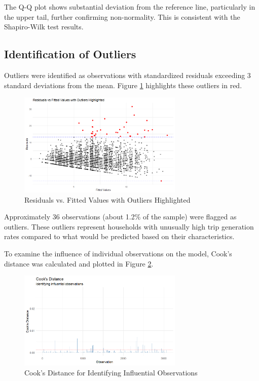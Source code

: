 \documentclass[12pt]{article}
\begin{document}
The Q-Q plot shows substantial deviation from the reference line, particularly in the upper tail, further confirming non-normality. This is consistent with the Shapiro-Wilk test results.

\subsection{Identification of Outliers}

Outliers were identified as observations with standardized residuals exceeding 3 standard deviations from the mean. Figure \ref{fig:outliers} highlights these outliers in red.

\begin{figure}[H]
\centering
\includegraphics[width=0.7\textwidth]{media/Residuals_with_Outliers.png}
\caption{Residuals vs. Fitted Values with Outliers Highlighted}
\label{fig:outliers}
\end{figure}

Approximately 36 observations (about 1.2\% of the sample) were flagged as outliers. These outliers represent households with unusually high trip generation rates compared to what would be predicted based on their characteristics.

To examine the influence of individual observations on the model, Cook's distance was calculated and plotted in Figure \ref{fig:cooks_distance}.

\begin{figure}[H]
\centering
\includegraphics[width=0.7\textwidth]{media/Cooks_Distance.png}
\caption{Cook's Distance for Identifying Influential Observations}
\label{fig:cooks_distance}
\end{figure}
\end{document}
